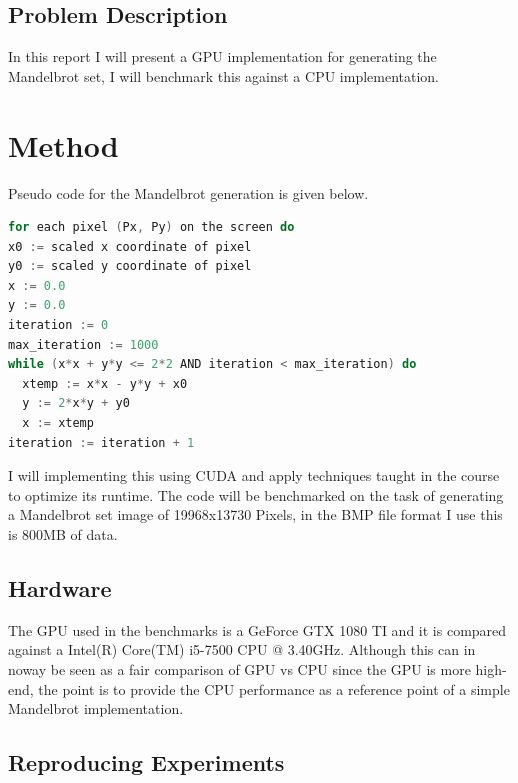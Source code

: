 \documentclass{article}
\begin{document}
\subsection{Problem Description}%
\label{sub:problem_description}

In this report I will present a GPU implementation for generating the Mandelbrot set, I will
benchmark this against a CPU implementation. 


\section{Method}%
\label{sec:method}



Pseudo code for the Mandelbrot generation
\cite{mandelbrot} is
given below.

\begin{mdframed}[backgroundcolor=codeColor,leftmargin=0.0cm,hidealllines=true,%
  innerleftmargin=0.1cm,innerrightmargin=0.1cm,innertopmargin=0.5cm,innerbottommargin=0.10cm,
  roundcorner=15pt]
\begin{lstlisting}[language=c]
for each pixel (Px, Py) on the screen do
x0 := scaled x coordinate of pixel
y0 := scaled y coordinate of pixel 
x := 0.0
y := 0.0
iteration := 0
max_iteration := 1000
while (x*x + y*y <= 2*2 AND iteration < max_iteration) do
  xtemp := x*x - y*y + x0
  y := 2*x*y + y0
  x := xtemp
iteration := iteration + 1
\end{lstlisting}
\end{mdframed}

I will implementing this using CUDA and apply techniques taught in the course to optimize
its runtime. The code will be benchmarked on the task of generating a Mandelbrot set image of
19968x13730 Pixels, in the BMP file format I use this is 800MB of data. 

\subsection{Hardware}%
\label{sub:hardware}

The GPU used in the benchmarks is a GeForce GTX 1080 TI and it is compared against a Intel(R)
Core(TM) i5-7500 CPU @ 3.40GHz. Although this can in noway be seen as a fair comparison of
GPU vs CPU since the GPU is more high-end, the point is to provide the CPU performance as a
reference point of a simple Mandelbrot implementation.

\subsection{Reproducing Experiments}%
\label{ssub:compiling}
\end{document}
